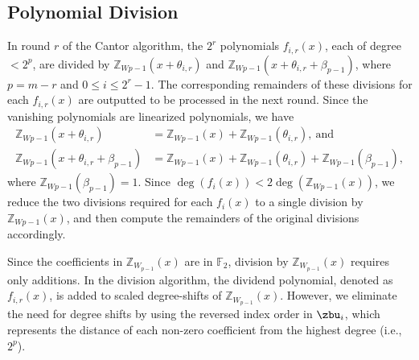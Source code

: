 \subsection{Polynomial Division}
In round $r$ of the Cantor algorithm, the $2^r$ polynomials $f_{i,r}(x)$, each of degree $< 2^{p}$, are divided by $\mathbb{Z}_{W{p-1}}(x + \theta_{i,r})$ and $\mathbb{Z}_{W{p-1}}(x + \theta_{i,r} + \beta_{p-1})$, where $p = m - r$ and $0 \leq i \leq 2^r - 1$. The corresponding remainders of these divisions for each $f_{i,r}(x)$ are outputted to be processed in the next round. Since the vanishing polynomials are linearized polynomials, we have
\begin{align*}
	\mathbb{Z}_{W{p-1}}(x + \theta_{i,r}) &= \mathbb{Z}_{W{p-1}}(x) + \mathbb{Z}_{W{p-1}}(\theta_{i,r}),\ \text{and}\\
	\mathbb{Z}_{W{p-1}}(x + \theta_{i,r} + \beta_{p-1}) &= \mathbb{Z}_{W{p-1}}(x) + \mathbb{Z}_{W{p-1}}(\theta_{i,r}) + \mathbb{Z}_{W{p-1}}(\beta_{p-1}),
\end{align*}
where $\mathbb{Z}_{W{p-1}}(\beta_{p-1}) = 1$. Since $\deg(f_i(x)) < 2\deg(\mathbb{Z}_{W{p-1}}(x))$, we reduce the two divisions required for each $f_i(x)$ to a single division by $\mathbb{Z}_{W{p-1}}(x)$, and then compute the remainders of the original divisions accordingly.




Since the coefficients in $\mathbb{Z}_{W_{p-1}}(x)$ are in $\mathbb{F}_2$, division by $\mathbb{Z}_{W_{p-1}}(x)$ requires only additions. In the division algorithm, the dividend polynomial, denoted as $f_{i,r}(x)$, is added to scaled degree-shifts of $\mathbb{Z}_{W_{p-1}}(x)$. However, we eliminate the need for degree shifts by using the reversed index order in $\zbu_i$, which represents the distance of each non-zero coefficient from the highest degree (i.e., $2^p$). 

